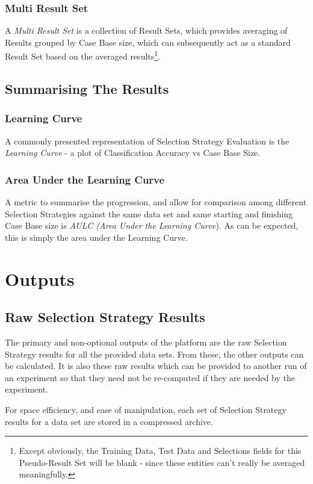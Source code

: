 \documentclass[a4paper,11pt]{report}
\begin{document}
\subsubsection{Multi Result Set}
A \emph{Multi Result Set} is a collection of Result Sets, which provides averaging of Results grouped by Case Base size, which can subsequently act as a standard Result Set based on the averaged results\footnote{Except obviously, the Training Data, Test Data and Selections fields for this Pseudo-Result Set will be blank - since these entities can't really be averaged meaningfully.}.

\subsection{Summarising The Results}
\subsubsection{Learning Curve}\label{sec:multiresultset}
A commonly presented representation of Selection Strategy Evaluation is the \emph{Learning Curve} - a plot of Classification Accuracy vs Case Base Size.

\subsubsection{Area Under the Learning Curve}
A metric to summarise the progression, and allow for comparison among different Selection Strategies against the same data set and same starting and finishing Case Base size is \emph{AULC (Area Under the Learning Curve}). As can be expected, this is simply the area under the Learning Curve.

\section{Outputs}

\subsection{Raw Selection Strategy Results}
The primary and non-optional outputs of the platform are the raw Selection Strategy results for all the provided data sets. From these, the other outputs can be calculated. It is also these raw results which can be provided to another run of an experiment so that they need not be re-computed if they are needed by the experiment. 

For space efficiency, and ease of manipulation, each set of Selection Strategy results for a data set are stored in a compressed archive.
\end{document}
